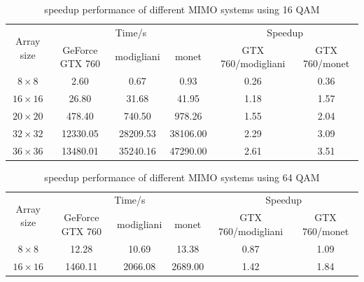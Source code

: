 \documentclass[12pt,a4paper,final]{article}
\begin{document}
\begin{spacing}{2.5}
\begin{table}[htb]
\centering
\begin{tabular}{|c|c|c|c|c|c|}
\hline
\multirow{2}{*}{ Array size} & \multicolumn{3}{|c|}{Time/s} & \multicolumn{2}{|c|}{Speedup}\\
\cline{2-6}
&GeForce GTX 760 & modigliani & monet &  GTX 760/modigliani  &  GTX 760/monet \\
\hline
$8\times 8$&2.60& 0.67&0.93 & 0.26&0.36 \\
\hline
$16\times 16$&26.80 & 31.68&41.95& 1.18& 1.57\\
\hline
$20\times 20$&478.40 & 740.50& 978.26& 1.55& 2.04\\
\hline
$32\times 32$&12330.05& 28209.53& 38106.00& 2.29& 3.09\\
\hline
$36\times 36$& 13480.01&35240.16&47290.00&2.61& 3.51 \\
\hline
\end{tabular}
\caption{speedup performance of different MIMO systems using 16 QAM}
\label{speedup2}
\end{table}

\begin{table}[htb]
\centering
\begin{tabular}{|c|c|c|c|c|c|}
\hline
\multirow{2}{*}{ Array size} & \multicolumn{3}{|c|}{Time/s} & \multicolumn{2}{|c|}{Speedup}\\
\cline{2-6}
&GeForce GTX 760 & modigliani & monet &  GTX 760/modigliani  &  GTX 760/monet \\
\hline
$8\times 8$&12.28& 10.69&13.38 & 0.87&1.09 \\
\hline
$16\times 16$&1460.11 & 2066.08&2689.00& 1.42& 1.84\\

\hline

\end{tabular}
\caption{speedup performance of different MIMO systems using 64 QAM}
\label{speedup3}
\end{table}


\end{spacing}
\end{document}
